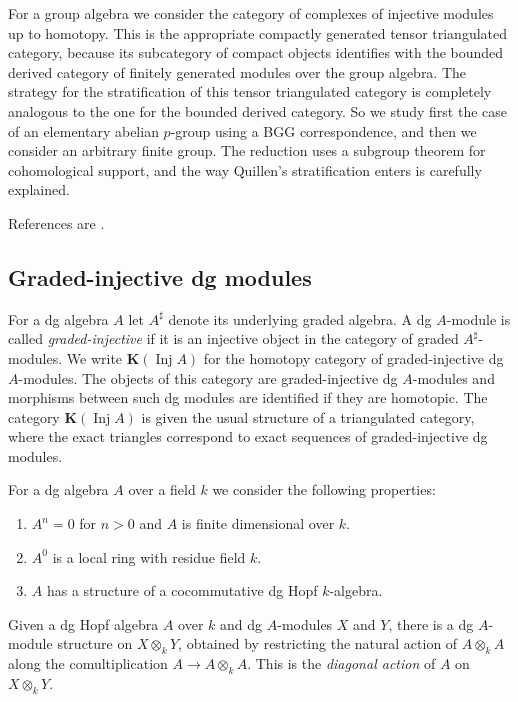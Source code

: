 \documentclass{amsart}[a4]
\theoremstyle{definition}
\theoremstyle{remark}
\numberwithin{equation}{section}
\newcommand{\Inj}{\operatorname{Inj}}
\newcommand{\bfK}{\mathbf K}
\begin{document}
For a group algebra we consider the category of complexes of injective
modules up to homotopy. This is the appropriate compactly generated
tensor triangulated category, because its subcategory of compact
objects identifies with the bounded derived category of finitely
generated modules over the group algebra. The strategy for the
stratification of this tensor triangulated category is completely
analogous to the one for the bounded derived category. So we study
first the case of an elementary abelian $p$-group using a BGG
correspondence, and then we consider an arbitrary finite group. The
reduction uses a subgroup theorem for cohomological support, and the
way Quillen's stratification enters is carefully explained.

References are \cite{Benson/Iyengar/Krause:2011b,Quillen:1971b,Quillen:1971c}.

\subsection*{Graded-injective dg modules}

For a dg algebra $A$ let $A^\sharp$ denote its underlying graded
algebra. A dg $A$-module is called \emph{graded-injective} if it is an
injective object in the category of graded $A^\sharp$-modules. We
write $\bfK(\Inj A)$ for the homotopy category of graded-injective dg
$A$-modules. The objects of this category are graded-injective dg
$A$-modules and morphisms between such dg modules are identified if
they are homotopic. The category $\bfK(\Inj A)$ is given the usual
structure of a triangulated category, where the exact triangles
correspond to exact sequences of graded-injective dg modules.

For a dg algebra $A$ over a field $k$ we consider the following properties:
\begin{enumerate}
\item[(A1)] $A^n=0$ for $n>0$ and $A$ is finite dimensional over $k$. 
\item[(A2)] $A^0$ is a local ring with residue field $k$.
\item[(A3)] $A$ has a structure of a cocommutative dg Hopf $k$-algebra.
\end{enumerate}

Given a dg Hopf algebra $A$ over $k$ and dg $A$-modules $X$ and $Y$, there is a
dg $A$-module structure on $X\otimes_k Y$, obtained by restricting the
natural action of $A\otimes_k A$ along the comultiplication
$A\to A\otimes_k A$.  This is the \emph{diagonal action} of $A$ on
$X\otimes_k Y$.
\end{document}
